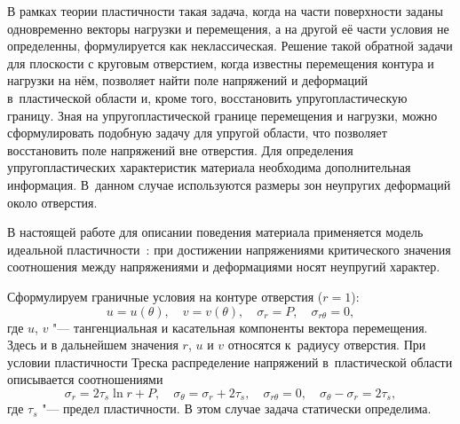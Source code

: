 В рамках теории пластичности такая задача, когда на части поверхности заданы одновременно векторы нагрузки и перемещения, а на другой её части условия не определенны, формулируется как неклассическая. 
Решение такой обратной задачи для плоскости с круговым отверстием, когда известны перемещения контура и нагрузки на нём, позволяет найти поле напряжений и деформаций в~пластической области и, кроме того, восстановить упругопластическую границу. 
Зная на упругопластической границе перемещения и нагрузки, можно сформулировать подобную задачу для упругой области, что позволяет восстановить поле напряжений вне отверстия.
Для определения упругопластических характеристик материала необходима дополнительная информация. 
В~данном случае используются размеры зон неупругих деформаций около отверстия.

В настоящей работе для описании поведения материала применяется модель идеальной пластичности~\cite{shvab:bib2}:
при достижении напряжениями критического значения соотношения между напряжениями и деформациями носят неупругий характер.

Сформулируем граничные условия на контуре отверстия ($r=1$):
\begin{equation}
\label{shvab:eq1}
u=u(\theta ),\quad v =v (\theta ), \quad  \sigma _r =P, \quad \sigma _{r\theta } =0,
\end{equation}
где $u$, $v $ "--- тангенциальная и касательная компоненты вектора
перемещения. Здесь и в дальнейшем значения $r$, $u$ и $v $ относятся к~радиусу отверстия. 
При условии пластичности Треска распределение напряжений в~пластической области описывается соотношениями \cite{shvab:bib4}
\begin{equation}
\label{shvab:eq2}
 \sigma _r =2\tau _s \ln r+P, \quad 
 \sigma _\theta =\sigma _r +2\tau _s, \quad 
 \sigma _{r\theta } =0, \quad \sigma _\theta -\sigma _r =2\tau _s,
\end{equation}
где $\tau _s $ "--- предел пластичности. В этом случае задача статически
определима.

